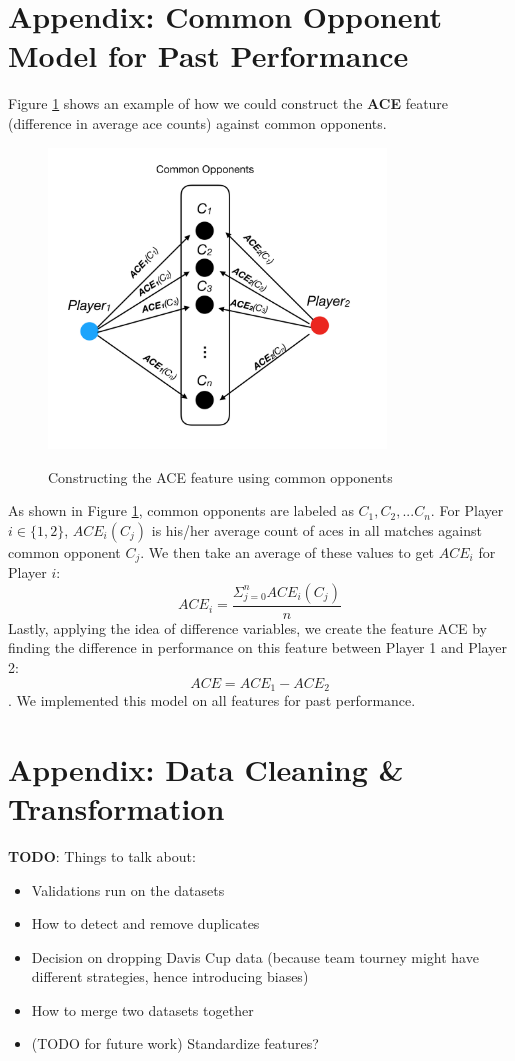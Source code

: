 \documentclass[paper=a4, fontsize=11pt]{scrartcl} %
\numberwithin{equation}{section} %
\numberwithin{figure}{section} %
\numberwithin{table}{section} %
\begin{document}
\section{Appendix: Common Opponent Model for Past Performance}
Figure \ref{fig:CO} shows an example of how we could construct the \textbf{ACE} feature (difference in average ace counts) against common opponents. 
\begin{figure}
  \caption{Constructing the ACE feature using common opponents}
  \centering
    \includegraphics[width=0.8\textwidth]{CO}
  \label{fig:CO}
\end{figure}
As shown in Figure \ref{fig:CO}, common opponents are labeled as $C_1, C_2, ...C_n$. For Player $i \in \{1,2\}$, $ACE_i(C_j)$ is his/her average count of aces in all matches against common opponent $C_j$. We then take an average of these values to get $ACE_i$ for Player $i$: $$ACE_i = \frac{\Sigma_{j=0}^n ACE_i(C_j)}{n}$$
Lastly, applying the idea of difference variables, we create the feature ACE by finding the difference in performance on this feature between Player 1 and Player 2: $$ACE = ACE_1 - ACE_2$$.  We implemented this model on all features for past performance.

\section{Appendix: Data Cleaning \& Transformation}
\textbf{TODO}: Things to talk about:
\begin{itemize}
\item Validations run on the datasets
\item How to detect and remove duplicates
\item Decision on dropping Davis Cup data (because team tourney might have different strategies, hence introducing biases)
\item How to merge two datasets together
\item (TODO for future work) Standardize features? 
\end{itemize}
\end{document}
